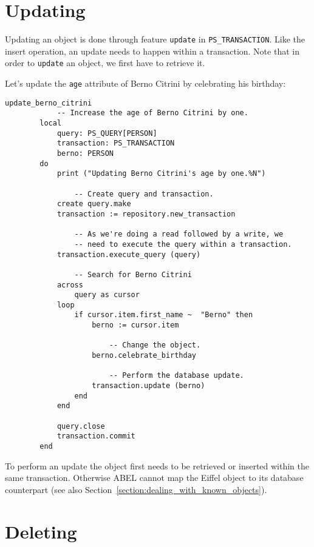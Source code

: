\documentclass[a4paper,12pt]{report}
\begin{document}
\section{Updating}

Updating an object is done through feature \lstinline{update} in \lstinline{PS_TRANSACTION}.
Like the insert operation, an update needs to happen within a transaction.
Note that in order to \lstinline!update! an object, we first have to retrieve it.

Let's update the \lstinline{age} attribute of Berno Citrini by celebrating his birthday:

\begin{lstlisting}[language=OOSC2Eiffel, captionpos=b, caption={Update Berno Citrini's age.}, label={lst:tutorial_update}]
	update_berno_citrini
			-- Increase the age of Berno Citrini by one.
		local
			query: PS_QUERY[PERSON]
			transaction: PS_TRANSACTION
			berno: PERSON
		do
			print ("Updating Berno Citrini's age by one.%N")

				-- Create query and transaction.
			create query.make
			transaction := repository.new_transaction

				-- As we're doing a read followed by a write, we
				-- need to execute the query within a transaction.
			transaction.execute_query (query)

				-- Search for Berno Citrini
			across
				query as cursor
			loop
				if cursor.item.first_name ~  "Berno" then
					berno := cursor.item

						-- Change the object.
					berno.celebrate_birthday

						-- Perform the database update.
					transaction.update (berno)
				end
			end

			query.close
			transaction.commit
		end

\end{lstlisting}

To perform an update the object first needs to be retrieved or inserted within the same transaction.
Otherwise ABEL cannot map the Eiffel object to its database counterpart (see also Section~\ref{section:dealing_with_known_objects}).

\section{Deleting}
\label{section:simple_delete}
\end{document}
